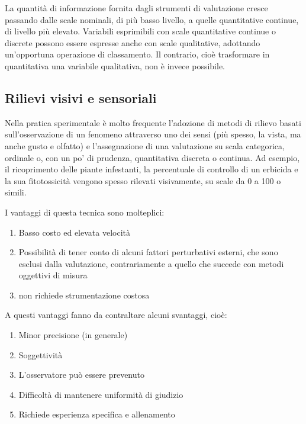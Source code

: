 \documentclass[a4paper,12pt,oneside]{book}
\providecommand{\tightlist}{%
  \setlength{\itemsep}{0pt}\setlength{\parskip}{0pt}}
\begin{document}
La quantità di informazione fornita dagli strumenti di valutazione cresce passando dalle scale nominali, di più basso livello, a quelle quantitative continue, di livello più elevato. Variabili esprimibili con scale quantitative continue o discrete possono essere espresse anche con scale qualitative, adottando un'opportuna operazione di classamento. Il contrario, cioè trasformare in quantitativa una variabile qualitativa, non è invece possibile.

\hypertarget{rilievi-visivi-e-sensoriali}{%
\subsection{Rilievi visivi e sensoriali}\label{rilievi-visivi-e-sensoriali}}

Nella pratica sperimentale è molto frequente l'adozione di metodi di rilievo basati sull'osservazione di un fenomeno attraverso uno dei sensi (più spesso, la vista, ma anche gusto e olfatto) e l'assegnazione di una valutazione su scala categorica, ordinale o, con un po' di prudenza, quantitativa discreta o continua. Ad esempio, il ricoprimento delle piante infestanti, la percentuale di controllo di un erbicida e la sua fitotossicità vengono spesso rilevati visivamente, su scale da 0 a 100 o simili.

I vantaggi di questa tecnica sono molteplici:

\begin{enumerate}
\def\labelenumi{\arabic{enumi}.}
\tightlist
\item
  Basso costo ed elevata velocità
\item
  Possibilità di tener conto di alcuni fattori perturbativi esterni, che sono esclusi dalla valutazione, contrariamente a quello che succede con metodi oggettivi di misura
\item
  non richiede strumentazione costosa
\end{enumerate}

A questi vantaggi fanno da contraltare alcuni svantaggi, cioè:

\begin{enumerate}
\def\labelenumi{\arabic{enumi}.}
\tightlist
\item
  Minor precisione (in generale)
\item
  Soggettività
\item
  L'osservatore può essere prevenuto
\item
  Difficoltà di mantenere uniformità di giudizio
\item
  Richiede esperienza specifica e allenamento
\end{enumerate}
\end{document}
